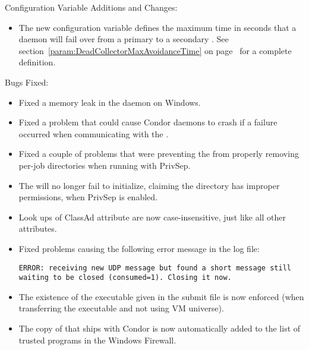 \noindent Configuration Variable Additions and Changes:

\begin{itemize}

\item The new configuration variable
   defines the maximum
  time in seconds that a daemon will fail over from a primary
   to a secondary .
  See section~\ref{param:DeadCollectorMaxAvoidanceTime} on
  page~\pageref{param:DeadCollectorMaxAvoidanceTime} for a
  complete definition.

\end{itemize}

\noindent Bugs Fixed:

\begin{itemize}

\item Fixed a memory leak in the  daemon on Windows.

\item Fixed a problem that could cause Condor daemons to crash if a
  failure occurred when communicating with the .

\item Fixed a couple of problems that were preventing the
   from properly removing per-job directories
  when running with PrivSep.

\item The  will no longer fail to initialize, 
  claiming the  directory has improper permissions,
  when PrivSep is enabled.

\item Look ups of ClassAd attribute  are now
  case-insensitive, just like all other attributes.

\item Fixed problems causing the following error message in the log file:

\footnotesize
\begin{verbatim}
ERROR: receiving new UDP message but found a short message still waiting to be closed (consumed=1). Closing it now.
\end{verbatim}
\normalsize

\item The existence of the executable given in the submit file is now 
  enforced (when transferring the executable and not using VM 
  universe).

\item The copy of  that ships with Condor is now automatically 
  added to the list of trusted programs in the Windows Firewall.


\end{itemize}

